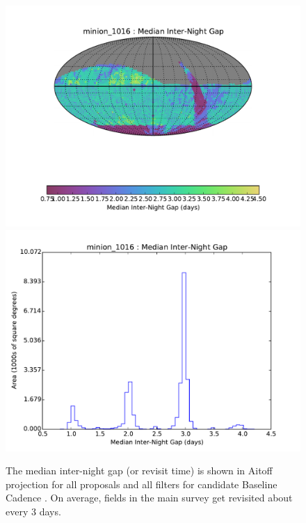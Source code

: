 \begin{figure}[t!]
\vskip -0.0in
\includegraphics[angle=0,width=0.49\hsize,clip]{figs/cadence/minion_1016_Median_Inter-Night_Gap_HEAL_SkyMap.pdf}
\includegraphics[angle=0,width=0.49\hsize,clip]{figs/cadence/minion_1016_Median_Inter-Night_Gap_HEAL_Histogram.pdf}
\vskip -0.1in
\caption{The median inter-night gap (or revisit time) is shown in Aitoff projection
for all proposals and all filters for candidate Baseline Cadence .
On average, fields in the main survey get revisited about every 3 days.}
\label{fig:enigmaGapAll}
\end{figure}

